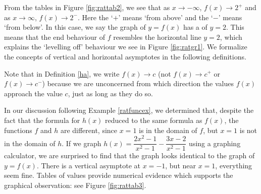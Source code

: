 From the tables in Figure \ref{fig:rattab2}, we see that as $x \rightarrow -\infty$, $f(x) \rightarrow 2^{+}$ and as $x \rightarrow \infty$, $f(x) \rightarrow 2^{-}$.  Here the `$+$' means `from above' and the `$-$' means `from below'.  In this case, we say the graph of $y=f(x)$ has a  of $y=2$.  This means that the end behaviour of $f$ resembles the horizontal line $y=2$, which explains the `levelling off' behaviour we see in Figure \ref{fig:ratgr1}.  We formalize the concepts of vertical and horizontal asymptotes in the following definitions.

\medskip


\medskip



\medskip

Note that in Definition \ref{ha}, we write $f(x) \rightarrow c$ (not $f(x) \rightarrow c^{+}$ or $f(x) \rightarrow c^{-}$) because we are unconcerned from which direction the values $f(x)$ approach the value $c$, just as long as they do so.

In our discussion following Example \ref{ratfuncex}, we determined that, despite the fact that the formula for $h(x)$ reduced to the same formula as $f(x)$, the functions $f$ and $h$ are different, since $x=1$ is in the domain of $f$, but $x=1$ is not in the domain of $h$.  If we graph $h(x)=\dfrac{2x^2-1}{x^2-1} - \dfrac{3x-2}{x^2-1}$ using a graphing calculator, we are surprised to find that the graph looks identical to the graph of $y=f(x)$.   There is a vertical asymptote at $x=-1$, but near $x=1$, everything seem fine.  Tables of values provide numerical evidence which supports the graphical observation: see Figure \ref{fig:rattab3}.

